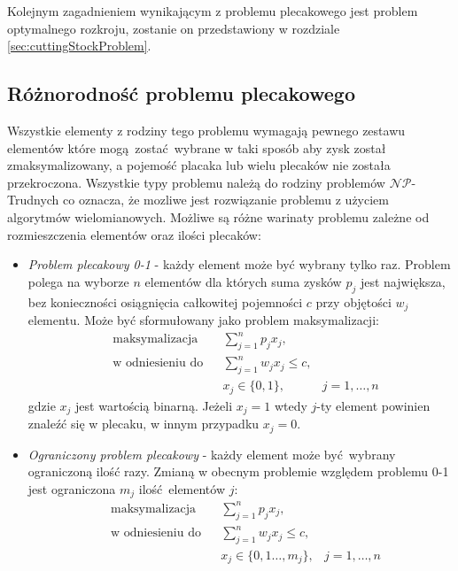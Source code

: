 Kolejnym zagadnieniem wynikającym z problemu plecakowego jest problem optymalnego rozkroju, zostanie on przedstawiony w rozdziale \ref{sec:cuttingStockProblem}.
\subsection{Różnorodność problemu plecakowego}
Wszystkie elementy z rodziny tego problemu wymagają pewnego zestawu elementów które mogą zostać wybrane w taki sposób aby zysk został zmaksymalizowany, a pojemość placaka lub wielu plecaków nie została przekroczona. Wszystkie typy problemu należą do rodziny problemów $\mathcal{NP}$-Trudnych co oznacza, że mozliwe jest rozwiązanie problemu z użyciem algorytmów wielomianowych. Możliwe są różne warinaty problemu zależne od rozmieszczenia elementów oraz ilości plecaków\cite{PisingerThesis}:
\begin{itemize}
  \item \textit{Problem plecakowy 0-1} - każdy element może być wybrany tylko raz. Problem polega na wyborze $n$ elementów dla których suma zysków $p_j$ jest największa, bez konieczności osiągnięcia całkowitej pojemności $c$ przy objętości $w_j$ elementu. Może być sformułowany jako problem maksymalizacji:
  \begin{equation}\label{01Knapsack}
    \begin{aligned}
      & \textrm{maksymalizacja} & & \sum_{j=1}^n p_jx_j, \\
      & \textrm{w odniesieniu do} & & \sum_{j=1}^n w_jx_j \le c, \\
      &&& x_j \in \{0,1\},& j = 1,\dots,n
    \end{aligned}
  \end{equation}
  gdzie $x_j$ jest wartością binarną. Jeżeli $x_j = 1$ wtedy $j$-ty element powinien znaleźć się w plecaku, w innym przypadku $x_j = 0$.
  \item \textit{Ograniczony problem plecakowy} - każdy element może być wybrany ograniczoną ilość razy. Zmianą w obecnym problemie względem problemu 0-1 jest ograniczona $m_j$ ilość elementów $j$:
  \begin{equation}\label{boundedKnapsack}
    \begin{aligned}
      & \textrm{maksymalizacja} & & \sum_{j=1}^n p_jx_j, \\
      & \textrm{w odniesieniu do} & & \sum_{j=1}^n w_jx_j \le c, \\
      &&& x_j \in \{0,1\dots,m_j\},& j = 1,\dots,n
    \end{aligned}
  \end{equation}

\end{itemize}
